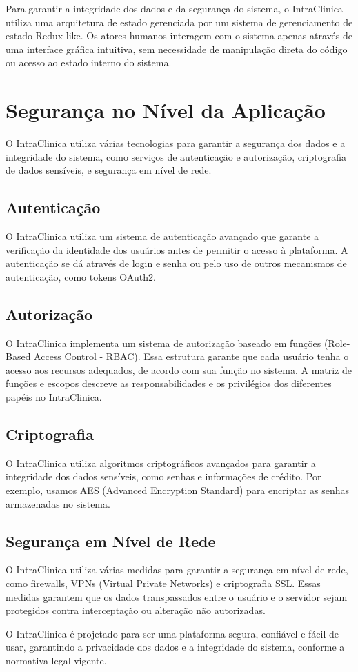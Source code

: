 Para garantir a integridade dos dados e da segurança do sistema, o IntraClinica utiliza uma arquitetura de estado gerenciada por um sistema de gerenciamento de estado Redux-like. Os atores humanos interagem com o sistema apenas através de uma interface gráfica intuitiva, sem necessidade de manipulação direta do código ou acesso ao estado interno do sistema.

\section{Segurança no Nível da Aplicação}

O IntraClinica utiliza várias tecnologias para garantir a segurança dos dados e a integridade do sistema, como serviços de autenticação e autorização, criptografia de dados sensíveis, e segurança em nível de rede.

\subsection{Autenticação}

O IntraClinica utiliza um sistema de autenticação avançado que garante a verificação da identidade dos usuários antes de permitir o acesso à plataforma. A autenticação se dá através de login e senha ou pelo uso de outros mecanismos de autenticação, como tokens OAuth2.

\subsection{Autorização}

O IntraClinica implementa um sistema de autorização baseado em funções (Role-Based Access Control - RBAC). Essa estrutura garante que cada usuário tenha o acesso aos recursos adequados, de acordo com sua função no sistema. A matriz de funções e escopos descreve as responsabilidades e os privilégios dos diferentes papéis no IntraClinica.

\subsection{Criptografia}

O IntraClinica utiliza algoritmos criptográficos avançados para garantir a integridade dos dados sensíveis, como senhas e informações de crédito. Por exemplo, usamos AES (Advanced Encryption Standard) para encriptar as senhas armazenadas no sistema.

\subsection{Segurança em Nível de Rede}

O IntraClinica utiliza várias medidas para garantir a segurança em nível de rede, como firewalls, VPNs (Virtual Private Networks) e criptografia SSL. Essas medidas garantem que os dados transpassados entre o usuário e o servidor sejam protegidos contra interceptação ou alteração não autorizadas.

O IntraClinica é projetado para ser uma plataforma segura, confiável e fácil de usar, garantindo a privacidade dos dados e a integridade do sistema, conforme a normativa legal vigente.